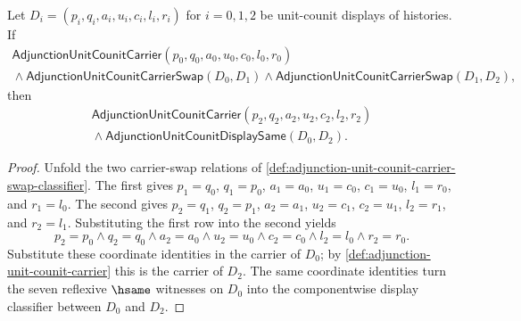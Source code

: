\begin{theorem}
\label{thm:adjunction-unit-counit-carrier-swap-involution}
Let $D_i=(p_i,q_i,a_i,u_i,c_i,l_i,r_i)$ for $i=0,1,2$ be unit-counit displays
of histories. If
$$
\begin{array}{l}
\mathsf{AdjunctionUnitCounitCarrier}(p_0,q_0,a_0,u_0,c_0,l_0,r_0)\\
{}\land\mathsf{AdjunctionUnitCounitCarrierSwap}(D_0,D_1)
\land\mathsf{AdjunctionUnitCounitCarrierSwap}(D_1,D_2),
\end{array}
$$
then
$$
\begin{array}{l}
\mathsf{AdjunctionUnitCounitCarrier}(p_2,q_2,a_2,u_2,c_2,l_2,r_2)\\
{}\land\mathsf{AdjunctionUnitCounitDisplaySame}(D_0,D_2).
\end{array}
$$
\end{theorem}
\begin{proof}
Unfold the two carrier-swap relations of
\autoref{def:adjunction-unit-counit-carrier-swap-classifier}. The first gives
$p_1=q_0$, $q_1=p_0$, $a_1=a_0$, $u_1=c_0$, $c_1=u_0$, $l_1=r_0$, and
$r_1=l_0$. The second gives $p_2=q_1$, $q_2=p_1$, $a_2=a_1$, $u_2=c_1$,
$c_2=u_1$, $l_2=r_1$, and $r_2=l_1$. Substituting the first row into the
second yields
$$
p_2=p_0\land q_2=q_0\land a_2=a_0\land u_2=u_0\land c_2=c_0\land
l_2=l_0\land r_2=r_0.
$$
Substitute these coordinate identities in the carrier of $D_0$; by
\autoref{def:adjunction-unit-counit-carrier} this is the carrier of $D_2$.
The same coordinate identities turn the seven reflexive $\hsame$ witnesses on
$D_0$ into the componentwise display classifier between $D_0$ and $D_2$.
\end{proof}

